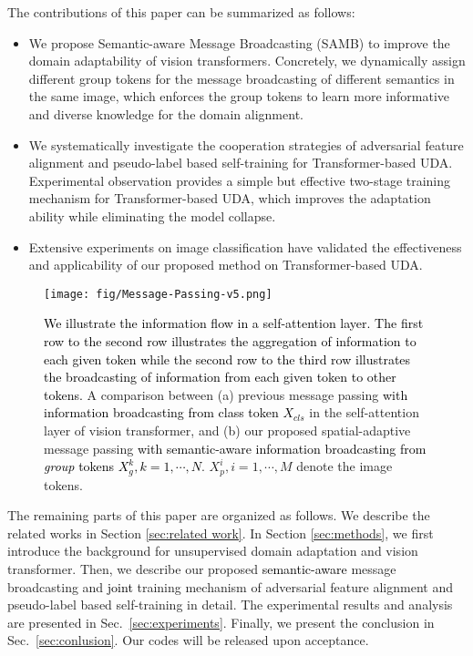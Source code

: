 \documentclass[journal]{IEEEtran}
\newcommand{\tcb}{\textcolor{black}}
\begin{document}
 The contributions of this paper can be summarized as follows:
 \begin{itemize}
     \item We propose Semantic-aware Message Broadcasting (SAMB) to improve the domain adaptability of vision transformers. Concretely, we dynamically assign  different group tokens for the message broadcasting of different semantics in the same image, which enforces the group tokens to learn more informative and diverse knowledge for the domain alignment.  


     \item We systematically investigate the cooperation strategies of adversarial feature alignment and pseudo-label based self-training for Transformer-based UDA. Experimental observation provides a simple but effective two-stage training mechanism for Transformer-based UDA, which improves the adaptation ability while eliminating the model collapse. 

     \item Extensive experiments on image classification have validated the effectiveness and applicability of our proposed method on Transformer-based UDA. 
     
 \end{itemize}


    
\begin{figure*}
    \centering
    \texttt{[image: fig/Message-Passing-v5.png]}
    \caption{\tcb{We illustrate the information flow in a self-attention layer. The first row to the second row illustrates the aggregation of information to each given token while the second row to the third row illustrates the broadcasting of information from each given token to other tokens.} A comparison between (a) previous message passing \tcb{with information broadcasting from class token $X_{cls}$} in the self-attention layer of vision transformer, and (b) our proposed spatial-adaptive message passing \tcb{with semantic-aware information broadcasting from \emph{group} tokens $X_{g}^k, k=1,\cdots,N$}. $X_p^i, i=1, \cdots, M$ denote the image tokens.} \label{fig:concept_comparion}
\end{figure*}


The remaining parts of this paper are organized as follows. We describe the related works in Section \ref{sec:related work}. In Section \ref{sec:methods}, we first introduce the background for unsupervised domain adaptation and vision transformer. Then, we describe our proposed \tcb{semantic-aware} message broadcasting and \tcb{joint} training mechanism {of adversarial feature alignment and pseudo-label based self-training} in detail. The experimental results and analysis are presented in Sec.~\ref{sec:experiments}. Finally, we present the conclusion in Sec.~\ref{sec:conlusion}.
Our codes will be released upon acceptance. 
\end{document}
